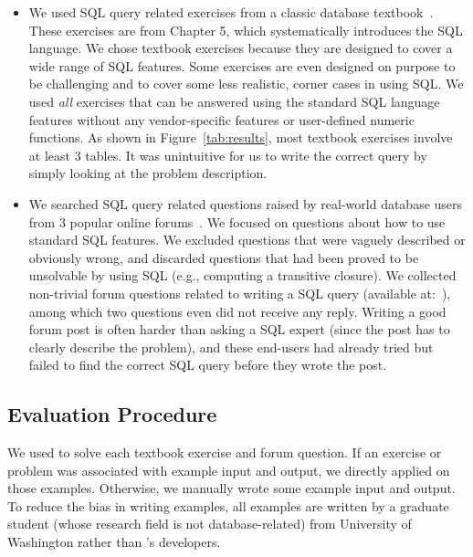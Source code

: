\begin{itemize}
\item We used \allex SQL query related exercises
from a classic database textbook~\cite{cowbook}.
These exercises are from Chapter 5, which systematically
introduces the SQL language. We chose textbook exercises because they
are designed to
cover a wide range of SQL features. Some exercises
are even designed on purpose to be challenging and to cover some less realistic,
corner cases in using SQL. 
We used \textit{all} exercises that can be answered using the standard
SQL language features without any vendor-specific
features or user-defined numeric functions.
As shown in Figure~\ref{tab:results},
most textbook exercises involve at least 3 tables. It was unintuitive
for us to write the correct query by simply looking at the problem
description.

\item We searched SQL query related questions raised by real-world
database users from 3 popular online forums~\cite{stackoverflow,
tutorialized, dbjournal}.
We focused on questions about how to use standard SQL features.
We excluded questions that were vaguely described or obviously
wrong, and discarded questions that had been proved
to be unsolvable by using SQL (e.g., computing a
transitive closure).
We collected \pnum non-trivial forum questions related to writing a SQL query
(available at:~\cite{forumq}), among which
two questions even did not receive any reply.
Writing a good forum post is often harder than asking
a SQL expert (since the post has to clearly 
describe the problem), and these end-users had already tried but
failed to find the correct SQL query before they wrote the post.
\end{itemize}



\vspace{-2mm}
\subsection{Evaluation Procedure}
\vspace{-1mm}

We used \ourtool to solve each textbook exercise and forum
question. If an exercise or problem
was associated with example input and output,
we directly applied \ourtool on those examples.
Otherwise, we manually wrote some example input and output.
To reduce the bias in writing
examples, all examples are written by a graduate
student (whose research field is not database-related) from University of Washington rather than
\ourtool's developers.


